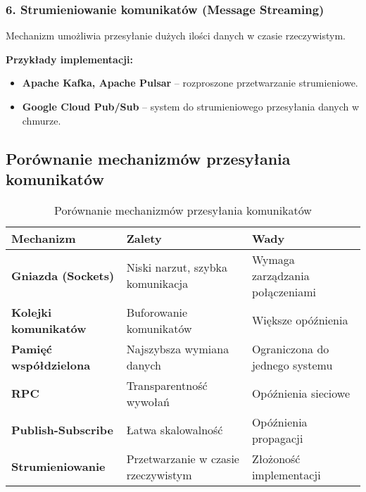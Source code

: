 \subsubsection{6. Strumieniowanie komunikatów (Message Streaming)}
Mechanizm umożliwia przesyłanie dużych ilości danych w czasie rzeczywistym.

\textbf{Przykłady implementacji:}
\begin{itemize}
    \item \textbf{Apache Kafka, Apache Pulsar} – rozproszone przetwarzanie strumieniowe.
    \item \textbf{Google Cloud Pub/Sub} – system do strumieniowego przesyłania danych w chmurze.
\end{itemize}

\subsection{Porównanie mechanizmów przesyłania komunikatów}

\begin{table}[h]
    \centering
    \renewcommand{\arraystretch}{1.3} %
    \begin{tabularx}{\textwidth}{|l|X|X|}
        \hline
        \textbf{Mechanizm} & \textbf{Zalety} & \textbf{Wady} \\
        \hline
        \textbf{Gniazda (Sockets)} & Niski narzut, szybka komunikacja & Wymaga zarządzania połączeniami \\
        \hline
        \textbf{Kolejki komunikatów} & Buforowanie komunikatów & Większe opóźnienia \\
        \hline
        \textbf{Pamięć współdzielona} & Najszybsza wymiana danych & Ograniczona do jednego systemu \\
        \hline
        \textbf{RPC} & Transparentność wywołań & Opóźnienia sieciowe \\
        \hline
        \textbf{Publish-Subscribe} & Łatwa skalowalność & Opóźnienia propagacji \\
        \hline
        \textbf{Strumieniowanie} & Przetwarzanie w czasie rzeczywistym & Złożoność implementacji \\
        \hline
    \end{tabularx}
    \caption{Porównanie mechanizmów przesyłania komunikatów}
\end{table}


